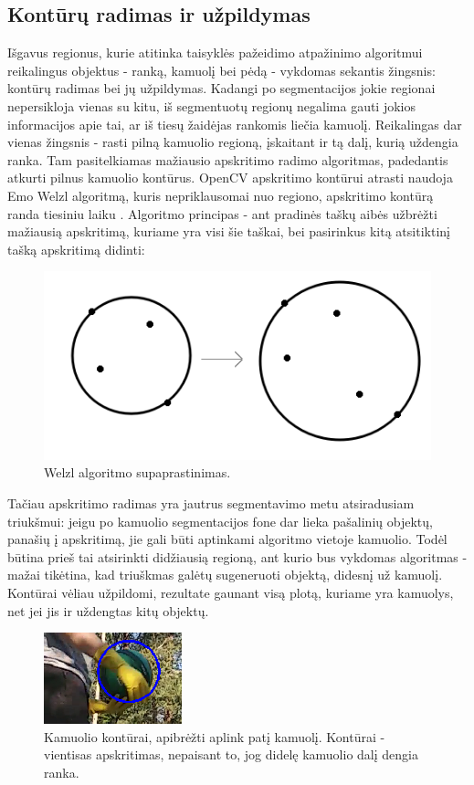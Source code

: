 \documentclass{VUMIFPSkursinis}
\begin{document}
\subsection{Kontūrų radimas ir užpildymas}
Išgavus regionus, kurie atitinka taisyklės pažeidimo atpažinimo algoritmui reikalingus objektus - ranką, kamuolį bei pėdą - vykdomas sekantis žingsnis: kontūrų radimas bei jų užpildymas. Kadangi po segmentacijos jokie regionai nepersikloja vienas su kitu, iš segmentuotų regionų negalima gauti jokios informacijos apie tai, ar iš tiesų žaidėjas rankomis liečia kamuolį. Reikalingas dar vienas žingsnis - rasti pilną kamuolio regioną, įskaitant ir tą dalį, kurią uždengia ranka. Tam pasitelkiamas mažiausio apskritimo radimo algoritmas, padedantis atkurti pilnus kamuolio kontūrus. OpenCV apskritimo kontūrui atrasti naudoja Emo Welzl algoritmą, kuris nepriklausomai nuo regiono, apskritimo kontūrą randa tiesiniu laiku \cite{smallestenclosing}. Algoritmo principas - ant pradinės taškų aibės užbrėžti mažiausią apskritimą, kuriame yra visi šie taškai, bei pasirinkus kitą atsitiktinį tašką apskritimą didinti: \cite{smallestenclosing}
\begin{figure}[H]
	\centering
	\includegraphics[scale=1]{imgs/welzl}
	\caption{Welzl algoritmo supaprastinimas.}
	\label{imgs:welzl}
\end{figure}
Tačiau apskritimo radimas yra jautrus segmentavimo metu atsiradusiam triukšmui: jeigu po kamuolio segmentacijos fone dar lieka pašalinių objektų, panašių į apskritimą, jie gali būti aptinkami algoritmo vietoje kamuolio. Todėl būtina prieš tai atsirinkti didžiausią regioną, ant kurio bus vykdomas algoritmas - mažai tikėtina, kad triuškmas galėtų sugeneruoti objektą, didesnį už kamuolį.
Kontūrai vėliau užpildomi, rezultate gaunant visą plotą, kuriame yra kamuolys, net jei jis ir uždengtas kitų objektų.
\begin{figure}[H]
	\centering
	\includegraphics[scale=1]{imgs/kamuol}
	\caption{Kamuolio kontūrai, apibrėžti aplink patį kamuolį. Kontūrai - vientisas apskritimas, nepaisant to, jog didelę kamuolio dalį dengia ranka.}
	\label{imgs:kamuol}
\end{figure}
\end{document}
